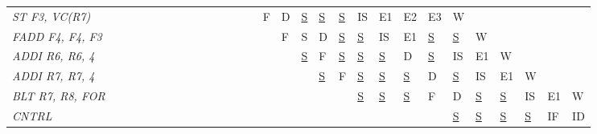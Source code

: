 \begin{table}[H]
{\begin{tabular}{l|llllllllllllllllllllllllllll}
    \textit{ST F3, VC(R7)}   &            &            &            &            &            &            &            &            &            &             &             &             &             & F           & D           & {\underline{S}}     & {\underline{S}}     & {\underline{S}}     & IS          & E1          & E2          & E3          & W           &             &             &             &             &             \\
    \textit{FADD F4, F4, F3} &            &            &            &            &            &            &            &            &            &             &             &             &             &             & F           & S           & D           & {\underline{S}}     & {\underline{S}}     & IS          & E1          & {\underline{S}}     & {\underline{S}}     & W           &             &             &             &             \\
    \textit{ADDI R6, R6, 4}  &            &            &            &            &            &            &            &            &            &             &             &             &             &             &             & {\underline{S}}     & F           & {\underline{S}}     & {\underline{S}}     & {\underline{S}}     & D           & {\underline{S}}     & IS          & E1          & W           &             &             &             \\
    \textit{ADDI R7, R7, 4}  &            &            &            &            &            &            &            &            &            &             &             &             &             &             &             &             & {\underline{S}}     & F           & {\underline{S}}     & {\underline{S}}     & {\underline{S}}     & D           & {\underline{S}}     & IS          & E1          & W           &             &             \\
    \textit{BLT R7, R8, FOR} &            &            &            &            &            &            &            &            &            &             &             &             &             &             &             &             &             &             & {\underline{S}}     & {\underline{S}}     & {\underline{S}}     & F           & D           & {\underline{S}}     & {\underline{S}}     & IS          & E1          & W           \\
    \textit{CNTRL}           &            &            &            &            &            &            &            &            &            &             &             &             &             &             &             &             &             &             &             &             &             &             & {\underline{S}}     & {\underline{S}}     & {\underline{S}}     & {\underline{S}}     & IF          & ID         
    \end{tabular}%
    }
\end{table}